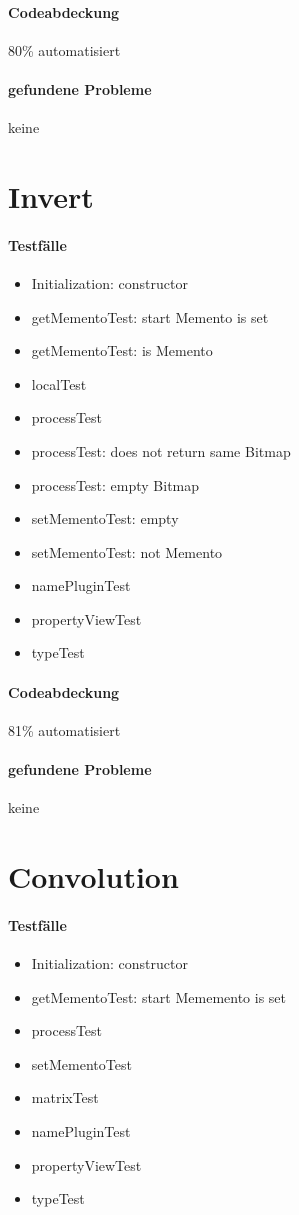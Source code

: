 \paragraph*{Codeabdeckung}
80\% automatisiert

\paragraph*{gefundene Probleme}
keine

\section{Invert}
\paragraph*{Testfälle}
\begin{itemize}
\item Initialization: constructor
\item getMementoTest: start Memento is set
\item getMementoTest: is Memento
\item localTest
\item processTest
\item processTest: does not return same Bitmap
\item processTest: empty Bitmap
\item setMementoTest: empty
\item setMementoTest: not Memento
\item namePluginTest
\item propertyViewTest
\item typeTest
\end{itemize}

\paragraph*{Codeabdeckung}
81\% automatisiert

\paragraph*{gefundene Probleme}
keine

\section{Convolution}
\paragraph*{Testfälle}
\begin{itemize}
\item Initialization: constructor
\item getMementoTest: start Mememento is set
\item processTest
\item setMementoTest
\item matrixTest
\item namePluginTest
\item propertyViewTest
\item typeTest
\end{itemize}

